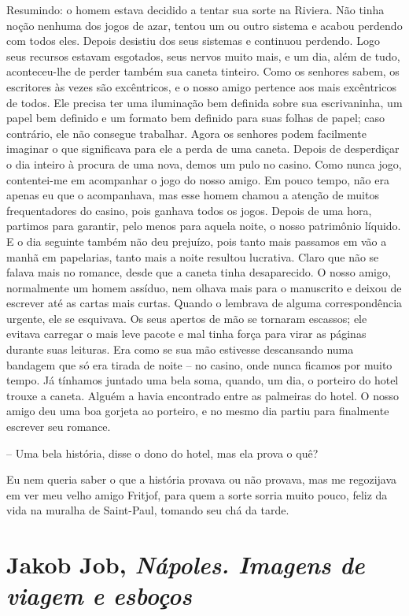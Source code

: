 Resumindo: o homem estava decidido a tentar sua sorte na Riviera. Não
tinha noção nenhuma dos jogos de azar, tentou um ou outro sistema e
acabou perdendo com todos eles. Depois desistiu dos seus sistemas e
continuou perdendo. Logo seus recursos estavam esgotados, seus nervos
muito mais, e um dia, além de tudo, aconteceu-lhe de perder também sua
caneta tinteiro. Como os senhores sabem, os escritores às vezes são
excêntricos, e o nosso amigo pertence aos mais excêntricos de todos. Ele
precisa ter uma iluminação bem definida sobre sua escrivaninha, um papel
bem definido e um formato bem definido para suas folhas de papel; caso
contrário, ele não consegue trabalhar. Agora os senhores podem
facilmente imaginar o que significava para ele a perda de uma caneta.
Depois de desperdiçar o dia inteiro à procura de uma nova, demos um pulo
no casino. Como nunca jogo, contentei-me em acompanhar o jogo do nosso
amigo. Em pouco tempo, não era apenas eu que o acompanhava, mas esse
homem chamou a atenção de muitos frequentadores do casino, pois ganhava
todos os jogos. Depois de uma hora, partimos para garantir, pelo menos
para aquela noite, o nosso patrimônio líquido. E o dia seguinte também
não deu prejuízo, pois tanto mais passamos em vão a manhã em papelarias,
tanto mais a noite resultou lucrativa. Claro que não se falava mais no
romance, desde que a caneta tinha desaparecido. O nosso amigo,
normalmente um homem assíduo, nem olhava mais para o manuscrito e deixou
de escrever até as cartas mais curtas. Quando o lembrava de alguma
correspondência urgente, ele se esquivava. Os seus apertos de mão se
tornaram escassos; ele evitava carregar o mais leve pacote e mal tinha
força para virar as páginas durante suas leituras. Era como se sua mão
estivesse descansando numa bandagem que só era tirada de noite -- no
casino, onde nunca ficamos por muito tempo. Já tínhamos juntado uma bela
soma, quando, um dia, o porteiro do hotel trouxe a caneta. Alguém a
havia encontrado entre as palmeiras do hotel. O nosso amigo deu uma boa
gorjeta ao porteiro, e no mesmo dia partiu para finalmente escrever seu
romance.

-- Uma bela história, disse o dono do hotel, mas ela prova o quê?

Eu nem queria saber o que a história provava ou não provava, mas me
regozijava em ver meu velho amigo Fritjof, para quem a sorte sorria
muito pouco, feliz da vida na muralha de Saint-Paul, tomando seu chá da
tarde.

\chapter{Jakob Job, \emph{Nápoles. Imagens de viagem e esboços}} 

